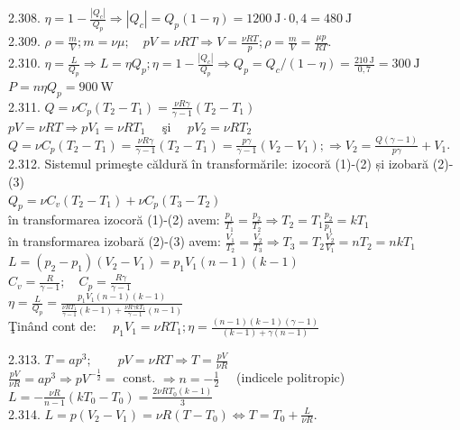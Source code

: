 2.308. $\eta=1-\frac{\left|Q_{c}\right|}{Q_{p}} \Rightarrow\left|Q_{c}\right|=Q_{p}(1-\eta)=1200 \mathrm{~J} \cdot 0,4=480 \mathrm{~J}$\\

2.309. $\rho=\frac{m}{V} ; m=\nu \mu ; \quad p V=\nu R T \Rightarrow V=\frac{\nu R T}{p} ; \rho=\frac{m}{V}=\frac{\mu p}{R T}$.\\

2.310. $\eta=\frac{L}{Q_{p}} \Rightarrow L=\eta Q_{p} ; \eta=1-\frac{\left|Q_{c}\right|}{Q_{p}} \Rightarrow Q_{p}=Q_{c} /(1-\eta)=\frac{210 \mathrm{~J}}{0,7}=300 \mathrm{~J}$\\ $P=n \eta Q_{p}=900 \mathrm{~W}$\\

2.311. $Q=\nu C_{p}\left(T_{2}-T_{1}\right)=\frac{\nu R \gamma}{\gamma-1}\left(T_{2}-T_{1}\right)$\\ $p V=\nu R T \Rightarrow p V_{1}=\nu R T_{1} \quad$ şi $\quad p V_{2}=\nu R T_{2}$\\ $Q=\nu C_{p}\left(T_{2}-T_{1}\right)=\frac{\nu R \gamma}{\gamma-1}\left(T_{2}-T_{1}\right)=\frac{p \gamma}{\gamma-1}\left(V_{2}-V_{1}\right) ; \Rightarrow V_{2}=\frac{Q(\gamma-1)}{p \gamma}+V_{1}$.\\

2.312. Sistemul primeşte căldură în transformările: izocoră (1)-(2) și izobară (2)-(3)\\ $Q_{p}=\nu C_{v}\left(T_{2}-T_{1}\right)+\nu C_{p}\left(T_{3}-T_{2}\right)$\\ în transformarea izocoră (1)-(2) avem: $\frac{p_{1}}{T_{1}}=\frac{p_{2}}{T_{2}} \Rightarrow T_{2}=T_{1} \frac{p_{2}}{p_{1}}=k T_{1}$\\ în transformarea izobară (2)-(3) avem: $\frac{V_{1}}{T_{2}}=\frac{V_{2}}{T_{3}} \Rightarrow T_{3}=T_{2} \frac{V_{2}}{V_{1}}=n T_{2}=n k T_{1}$\\ $L=\left(p_{2}-p_{1}\right)\left(V_{2}-V_{1}\right)=p_{1} V_{1}(n-1)(k-1)$\\ $C_{v}=\frac{R}{\gamma-1} ; \quad C_{p}=\frac{R \gamma}{\gamma-1}$\\ $\eta=\frac{L}{Q_{p}}=\frac{p_{1} V_{1}(n-1)(k-1)}{\frac{\nu R T_{1}}{\gamma-1}(k-1)+\frac{\nu R \gamma k T_{1}}{\gamma-1}(n-1)}$\\ Ţinând cont de: $\quad p_{1} V_{1}=\nu R T_{1} ; \eta=\frac{(n-1)(k-1)(\gamma-1)}{(k-1)+\gamma(n-1)}$

2.313. $T=a p^{3} ; \quad \quad p V=\nu R T \Rightarrow T=\frac{p V}{\nu R}$ \\ $\frac{p V}{\nu R}=a p^{3} \Rightarrow p V^{-\frac{1}{2}}=$ const. $\Rightarrow n=-\frac{1}{2} \quad$ (indicele politropic) \\ $L=-\frac{\nu R}{n-1}\left(k T_{0}-T_{0}\right)=\frac{2 \nu R T_{0}(k-1)}{3}$\\

2.314. $L=p\left(V_{2}-V_{1}\right)=\nu R\left(T-T_{0}\right) \Leftrightarrow T=T_{0}+\frac{L}{\nu R}$.\\

